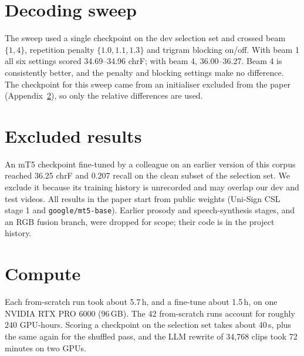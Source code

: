 \documentclass[11pt,twocolumn,a4paper]{article}
\begin{document}
\section{Decoding sweep}
\label{app:decode}

The sweep used a single checkpoint on the dev selection set and crossed beam $\{1, 4\}$, repetition penalty $\{1.0, 1.1, 1.3\}$ and trigram blocking on/off. With beam 1 all six settings scored 34.69--34.96 chrF; with beam 4, 36.00--36.27. Beam 4 is consistently better, and the penalty and blocking settings make no difference. The checkpoint for this sweep came from an initialiser excluded from the paper (Appendix~\ref{app:excluded}), so only the relative differences are used.

\section{Excluded results}
\label{app:excluded}

An mT5 checkpoint fine-tuned by a colleague on an earlier version of this corpus reached 36.25 chrF and 0.207 recall on the clean subset of the selection set. We exclude it because its training history is unrecorded and may overlap our dev and test videos. All results in the paper start from public weights (Uni-Sign CSL stage 1 and \texttt{google/mt5-base}). Earlier prosody and speech-synthesis stages, and an RGB fusion branch, were dropped for scope; their code is in the project history.

\section{Compute}

Each from-scratch run took about 5.7\,h, and a fine-tune about 1.5\,h, on one NVIDIA RTX PRO 6000 (96\,GB). The 42 from-scratch runs account for roughly 240 GPU-hours. Scoring a checkpoint on the selection set takes about 40\,s, plus the same again for the shuffled pass, and the LLM rewrite of 34{,}768 clips took 72 minutes on two GPUs.
\end{document}
